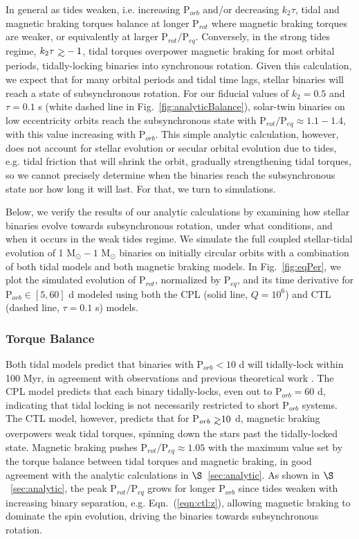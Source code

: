 \documentclass[twocolumn]{aastex61}
\def\gsim{~\rlap{$>$}{\lower 1.0ex\hbox{$\sim$}}}
\newcommand{\xxx}[1]{{\textbf{#1}}}
\begin{document}
In general as tides weaken, i.e. increasing P$_{orb}$ and/or decreasing $k_2 \tau$, tidal and magnetic braking torques balance at longer P$_{rot}$ where magnetic braking torques are weaker, or equivalently at larger P$_{rot}/$P$_{eq}$. Conversely, in the strong tides regime, $k_2 \tau \gsim -1$, tidal torques overpower magnetic braking for most orbital periods, tidally-locking binaries into synchronous rotation. Given this calculation, we expect that for many orbital periods and tidal time lags, stellar binaries will reach a state of subsynchronous rotation. For our fiducial values of $k_2 = 0.5$ and $\tau = 0.1$ s (white dashed line in Fig.~\ref{fig:analyticBalance}), solar-twin binaries on low eccentricity orbits reach the subsynchronous state with P$_{rot}/$P$_{eq} \approx 1.1-1.4$, with this value increasing with P$_{orb}$. This simple analytic calculation, however, does not account for stellar evolution or secular orbital evolution due to tides, e.g. tidal friction that will shrink the orbit, gradually strengthening tidal torques, so we cannot precisely determine when the binaries reach the subsynchronous state nor how long it will last. For that, we turn to simulations.  

Below, we verify the results of our analytic calculations by examining how stellar binaries evolve towards subsynchronous rotation, under what conditions, and when it occurs in the weak tides regime. We simulate the full coupled stellar-tidal evolution of 1 M$_{\odot} - 1$ M$_{\odot}$ binaries on initially circular orbits with a combination of both tidal models and both magnetic braking models. In Fig.~\ref{fig:eqPer}, we plot the simulated evolution of P$_{rot}$, normalized by P$_{eq}$, and its time derivative for P$_{orb} \in [5,60]$ d modeled using both the CPL (solid line, $Q=10^6$) and CTL (dashed line, $\tau = 0.1$ s) models. 

\subsubsection{\xxx{Torque Balance}} \label{sec:mattBalance}

Both tidal models predict that binaries with P$_{orb} < 10$ d will tidally-lock within 100 Myr, in agreement with observations \citep{Meibom2005} and previous theoretical work \citep{Zahn1989}. The CPL model predicts that each binary tidally-locks, even out to P$_{orb} = 60$ d, indicating that tidal locking is not necessarily restricted to short P$_{orb}$ systems. The CTL model, however, predicts that for P$_{orb} \gsim 10$ d, magnetic braking overpowers weak tidal torques, spinning down the stars past the tidally-locked state. Magnetic braking pushes P$_{rot}/$P$_{eq} \approx 1.05$ with the maximum value set by the torque balance between tidal torques and magnetic braking, in good agreement with the analytic calculations in $\S$~\ref{sec:analytic}. As shown in $\S$~\ref{sec:analytic}, the peak P$_{rot}/$P$_{eq}$ grows for longer P$_{orb}$ since tides weaken with increasing binary separation, e.g. Eqn.~(\ref{eqn:ctl:z}), allowing magnetic braking to dominate the spin evolution, driving the binaries towards subsynchronous rotation. 
\end{document}
